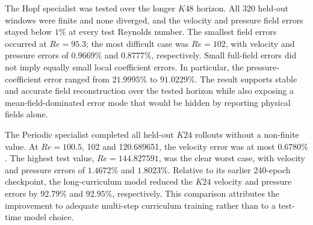 The Hopf specialist was tested over the longer $K48$ horizon.  All 320
held-out windows were finite and none diverged, and the velocity and pressure
field errors stayed below $1\%$ at every test Reynolds number.  The smallest
field errors occurred at $Re=95.3$; the most difficult case was $Re=102$,
with velocity and pressure errors of $0.9669\%$ and $0.8777\%$,
respectively.  Small full-field errors did not imply equally small local
coefficient errors.  In particular, the pressure-coefficient error ranged
from $21.9995\%$ to $91.0229\%$.  The result supports stable and accurate
field reconstruction over the tested horizon while also exposing a
mean-field-dominated error mode that would be hidden by reporting physical
fields alone.

The Periodic specialist completed all held-out $K24$ rollouts without a
non-finite value.  At $Re=100.5$, 102 and 120.689651, the velocity error was
at most $0.6780\%$.  The highest test value, $Re=144.827591$, was the clear
worst case, with velocity and pressure errors of $1.4672\%$ and $1.8023\%$.
Relative to its earlier 240-epoch checkpoint, the long-curriculum model
reduced the $K24$ velocity and pressure errors by $92.79\%$ and $92.95\%$,
respectively.  This comparison attributes the improvement to adequate
multi-step curriculum training rather than to a test-time model choice.

